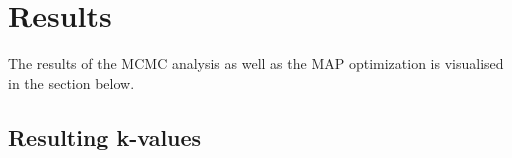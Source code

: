 \chapter{Results} \label{results}

The results of the MCMC analysis as well as the MAP optimization is visualised in the section below.
\section{Resulting k-values}

